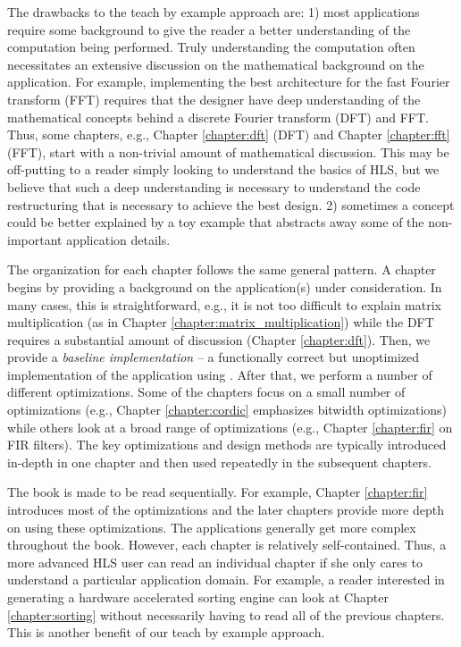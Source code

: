 The drawbacks to the teach by example approach are: 1) most applications require some background to give the reader a better understanding of the computation being performed. Truly understanding the computation often necessitates an extensive discussion on the mathematical background on the application. For example, implementing the best architecture for the fast Fourier transform (FFT) requires that the designer have deep understanding of the mathematical concepts behind a discrete Fourier transform (DFT) and FFT. Thus, some chapters, e.g., Chapter \ref{chapter:dft} (DFT) and Chapter \ref{chapter:fft} (FFT), start with a non-trivial amount of mathematical discussion. This may be off-putting to a reader simply looking to understand the basics of HLS, but we believe that such a deep understanding is necessary to understand the code restructuring that is necessary to achieve the best design. 2) sometimes a concept could be better explained by a toy example that abstracts away some of the non-important application details. 

The organization for each chapter follows the same general pattern. A chapter begins by providing a background on the application(s) under consideration. In many cases, this is straightforward, e.g., it is not too difficult to explain matrix multiplication (as in Chapter \ref{chapter:matrix_multiplication}) while the DFT requires a substantial amount of discussion (Chapter \ref{chapter:dft}). Then, we provide a \emph{baseline implementation} -- a functionally correct but unoptimized implementation of the application using \VHLS. After that, we perform a number of different optimizations. Some of the chapters focus on a small number of optimizations (e.g., Chapter \ref{chapter:cordic} emphasizes bitwidth optimizations) while others look at a broad range of optimizations (e.g., Chapter \ref{chapter:fir} on FIR filters). The key optimizations and design methods are typically introduced in-depth in one chapter and then used repeatedly in the subsequent chapters. 

The book is made to be read sequentially. For example, Chapter \ref{chapter:fir} introduces most of the optimizations and the later chapters provide more depth on using these optimizations. The applications generally get more complex throughout the book. However, each chapter is relatively self-contained. Thus, a more advanced HLS user can read an individual chapter if she only cares to understand a particular application domain. For example, a reader interested in generating a hardware accelerated sorting engine can look at Chapter \ref{chapter:sorting} without necessarily having to read all of the previous chapters. This is another benefit of our teach by example approach.



